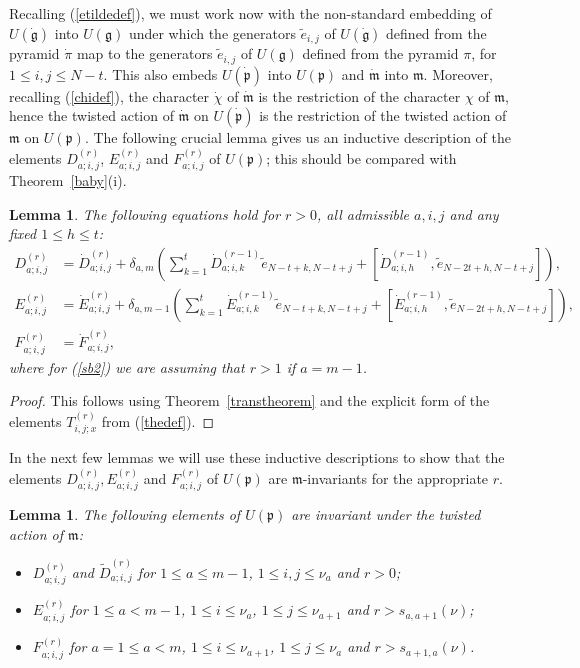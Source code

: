 \documentclass[twoside,12pt,reqno]{amsart}
\newtheorem{Lemma}[Proposition]{Lemma}
\begin{document}
Recalling (\ref{etildedef}), 
we must work now with the non-standard embedding
of $U(\dot{\mathfrak{g}})$ into $U(\mathfrak{g})$ under which the
generators $\tilde e_{i,j}$ of $U(\dot{\mathfrak{g}})$ defined from 
the pyramid $\dot\pi$ map to the generators
$\tilde e_{i,j}$ of $U(\mathfrak{g})$ defined from the pyramid $\pi$,
for $1 \leq i,j \leq N-t$.
This also embeds $U(\dot{\mathfrak{p}})$ into $U(\mathfrak{p})$ and
$\dot{\mathfrak{m}}$ into $\mathfrak{m}$.
Moreover, recalling (\ref{chidef}),
the character $\dot\chi$ of
$\dot{\mathfrak{m}}$ is the restriction of the character
$\chi$ of $\mathfrak{m}$, hence the twisted action of
$\dot{\mathfrak{m}}$ on $U(\dot{\mathfrak{p}})$ is the restriction of the
twisted action of $\mathfrak{m}$ on $U(\mathfrak{p})$.
The following crucial lemma gives us an inductive 
description of the elements 
$D_{a;i,j}^{(r)}$,
$E_{a;i,j}^{(r)}$ and $F_{a;i,j}^{(r)}$ of
$U(\mathfrak{p})$; 
this should be compared with Theorem~\ref{baby}(i). 

\begin{Lemma}\label{superbaby}
The following equations hold for $r > 0$, all admissible $a,i,j$ and 
any fixed $1 \leq h \leq t$:
\begin{align}\label{sb1}
D_{a;i,j}^{(r)} & = \dot D_{a;i,j}^{(r)} + \delta_{a,m}
\left(\sum_{k=1}^t
\dot D_{a;i,k}^{(r-1)} \tilde e_{N-t+k,N-t+j}
+
[\dot D_{a;i,h}^{(r-1)}, \tilde e_{N-2t+h,N-t+j}]\right),\\
E_{a;i,j}^{(r)} & = \dot E_{a;i,j}^{(r)} + \delta_{a,m-1}\left(
\sum_{k=1}^t \dot E_{a;i,k}^{(r-1)} \tilde e_{N-t+k,N-t+j}
+ [\dot E_{a;i,h}^{(r-1)}, \tilde e_{N-2t+h,N-t+j}]\right),\label{sb2}\\
F_{a;i,j}^{(r)} & = \dot F_{a;i,j}^{(r)},
\end{align}
where for (\ref{sb2}) we are assuming that $r > 1$ if $a=m-1$.
\end{Lemma}

\begin{proof}
This follows using Theorem~\ref{transtheorem} and the explicit form of the
elements $T_{i,j;x}^{(r)}$ from (\ref{thedef}).
\end{proof}

In the next few lemmas
we will use these inductive descriptions to show that the elements
$D_{a;i,j}^{(r)}, E_{a;i,j}^{(r)}$ and $F_{a;i,j}^{(r)}$ 
of $U(\mathfrak{p})$
are $\mathfrak{m}$-invariants for the appropriate $r$.

\begin{Lemma}\label{hor1}
The following elements of $U(\mathfrak{p})$ are
invariant under the twisted action of $\mathfrak{m}$:
\begin{itemize}
\item[(i)] $D_{a;i,j}^{(r)}$ and ${{\widetilde D}}_{a;i,j}^{(r)}$
for  $1 \leq a \leq m-1$, $1 \leq i,j \leq \nu_a$ and $r > 0$;
\item[(ii)] $E_{a;i,j}^{(r)}$ for 
$1 \leq a < m-1$, $1 \leq i \leq \nu_a$, $1 \leq j \leq \nu_{a+1}$
and $r>s_{a,a+1}(\nu)$;
\item[(iii)] $F_{a;i,j}^{(r)}$ 
 for 
$a=1 \leq a < m$, $1 \leq i \leq \nu_{a+1}$, $1 \leq j \leq \nu_{a}$
and $r > s_{a+1,a}(\nu)$.
\end{itemize}
\end{Lemma}
\end{document}
